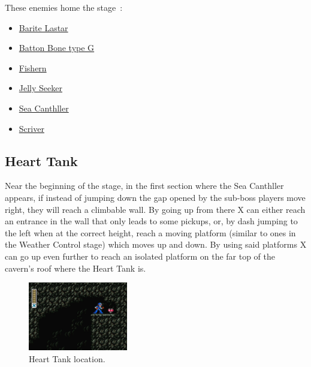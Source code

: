 These enemies home the stage~\cite{wiki:Deep_sea}:
\begin{itemize}
	\item \hyperlink {enem:Barite_Lastar}{Barite Lastar}
	\item \hyperlink {enem:Batton_Bone_type_G}{Batton Bone type G}
	\item \hyperlink {enem:Fishern}{Fishern}
	\item \hyperlink {enem:Jelly_Seeker}{Jelly Seeker}
	\item \hyperlink {miniboss:Sea_Canthller}{Sea Canthller}
	\item \hyperlink {enem:Scriver}{Scriver}
\end{itemize}

\subsection{Heart Tank}
Near the beginning of the stage, in the first section where the Sea Canthller appears, if instead of jumping down the gap opened by the sub-boss players move right, they will reach a climbable wall. By going up from there X can either reach an entrance in the wall that only leads to some pickups, or, by dash jumping to the left when at the correct height, reach a moving platform (similar to ones in the Weather Control stage) which moves up and down. By using said platforms X can go up even further to reach an isolated platform on the far top of the cavern's roof where the Heart Tank is.
\begin{figure}[htp]
	\centering
	\includegraphics[height=3cm]{figures/X2/Bubble_crab/Crab_heart.png}
	\caption{Heart Tank location.}
\end{figure}

